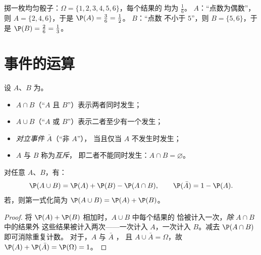 \begin{example}\label{ex:g10:proba:die}
掷一枚均匀骰子：$\Omega = \{1, 2, 3, 4, 5, 6\}$，每个结果的
均为 $\frac16$。 $A$：“点数为偶数”，则
$A = \{2, 4, 6\}$，于是 $\P(A) = \frac36 = \frac12$。 $B$：“点数
不小于 $5$”，则 $B = \{5, 6\}$，于是 $\P(B) = \frac26 =
\frac13$。
\end{example}

\section{事件的运算}

\begin{definition}[交集、并集、对立事件]\label{def:g10:proba:operations}
设 $A$、$B$ 为。
\begin{itemize}
  \item $A \cap B$（“$A$ 且 $B$”）表示两者同时发生；
  \item $A \cup B$（“$A$ 或 $B$”）表示二者至少有一个发生；
  \item \emph{对立事件} $\bar A$（“非 $A$”），
        当且仅当 $A$ 不发生时发生；
  \item $A$ 与 $B$ 称为\emph{互斥}，
        即二者不能同时发生：$A \cap B = \varnothing$。
\end{itemize}
\end{definition}

\begin{theorem}[加法公式]\label{thm:g10:proba:addition}
对任意 $A$、$B$，有：
\[
\P(A \cup B) = \P(A) + \P(B) - \P(A \cap B),
\qquad
\P(\bar A) = 1 - \P(A) .
\]
若，则第一式化简为
$\P(A \cup B) = \P(A) + \P(B)$。
\end{theorem}

\begin{proof}
将 $\P(A) + \P(B)$ 相加时，$A \cup B$ 中每个结果的
恰被计入一次，\emph{除} $A \cap B$ 中的结果外
这些结果被计入两次——一次计入 $A$，一次计入 $B$。减去 $\P(A \cap B)$ 即可消除重复计数。
对于，$A$ 与 $\bar A$ ，
且 $A \cup \bar A = \Omega$，故 $\P(A) + \P(\bar A) = \P(\Omega) = 1$。
\end{proof}

